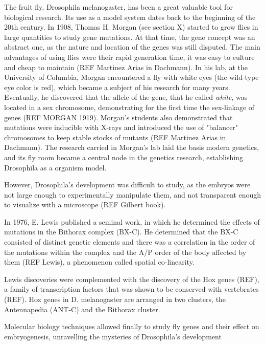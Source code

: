 The fruit fly, Drosophila melanogaster, has been a great valuable tool for biological research.
Its use as a model system dates back to the beginning of the 20th century.
In 1908, Thomas H. Morgan (see section X) started to grow flies in large quantities to study gene mutations. At that time, the gene concept was an abstract one, as the nature and location of the genes was still disputed.
%
The main advantages of using flies were their rapid generation time, it was easy to culture and cheap to maintain (REF Martinez Arias in Dachmann).
%
In his lab, at the University of Columbia, Morgan encountered a fly with white eyes (the wild-type eye color is red), which became a subject of his research for many years.
Eventually, he discovered that the allele of the gene, that he called \textit{white}, was located in a sex chromosome, demonstrating for the first time the sex-linkage of genes (REF MORGAN 1919).
%
Morgan's students also demonstrated that mutations were inducible with X-rays and introduced the use of "balancer" chromosomes to keep stable stocks of mutants (REF Martinez Arias in Dachmann).
%
The research carried in Morgan's lab laid the basis modern genetics, and its fly room became a central node in the genetics research, establishing Drosophila as a organism model.

However, Drosophila's development was difficult to study, as the embryos were not large enough to experimentally manipulate them, and not transparent enough to visualize with a microscope (REF Gilbert book).


In 1976, E. Lewis published a seminal work, in which he determined the effects of mutations in the Bithorax complex (BX-C).
He determined that the BX-C consisted of distinct genetic elements and there was a correlation in the order of the mutations within the complex and the A/P order of the body affected by them (REF Lewis), a phenomenon called spatial co-linearity.

Lewis discoveries were complemented with the discovery of the Hox genes (REF), a family of transcription factors that was shown to be conserved with vertebrates (REF).
Hox genes in D. melanogaster are arranged in two clusters, the Antennapedia (ANT-C) and the Bithorax cluster.

Molecular biology techniques allowed finally to study fly genes and their effect on embryogenesis, unravelling the mysteries of Drosophila's development 


